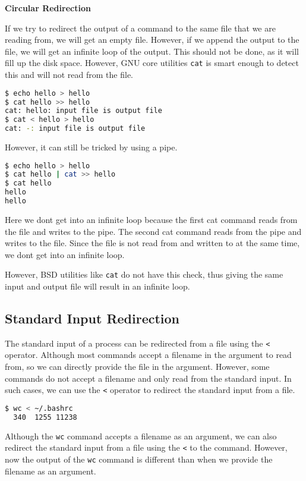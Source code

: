\textbf{Circular Redirection}

If we try to redirect the output of a command to the same file that
we are reading from, we will get an empty file. However, if we append
the output to the file, we will get an infinite loop of the output.
This should not be done, as it will fill up the disk space.
However, GNU core utilities \texttt{cat} is smart enough to detect
this and will not read from the file.

\begin{lstlisting}[language=bash]
$ echo hello > hello
$ cat hello >> hello
cat: hello: input file is output file
$ cat < hello > hello
cat: -: input file is output file
\end{lstlisting}

However, it can still be tricked by using a pipe.

\begin{lstlisting}[language=bash]
$ echo hello > hello
$ cat hello | cat >> hello
$ cat hello
hello
hello
\end{lstlisting}

Here we dont get into an infinite loop because the first cat command
reads from the file and writes to the pipe. The second cat command
reads from the pipe and writes to the file. Since the file is not
read from and written to at the same time, we dont get into an infinite
loop.

However, BSD utilities like \texttt{cat} do not have this check, thus
giving the same input and output file will result in an infinite loop.

\subsection{Standard Input Redirection}

The standard input of a process can be redirected from a file using
the \texttt{<} operator. Although most commands accept a filename
in the argument to read from, so we can directly provide the file
in the argument. However, some commands do not accept a filename
and only read from the standard input. In such cases, we can use
the \texttt{<} operator to redirect the standard input from a file.

\begin{lstlisting}[language=bash]
$ wc < ~/.bashrc
  340  1255 11238
\end{lstlisting}

Although the \texttt{wc} command accepts a filename as an argument,
we can also redirect the standard input from a file using the \texttt{<}
to the command. However, now the output of the \texttt{wc} command
is different than when we provide the filename as an argument.

